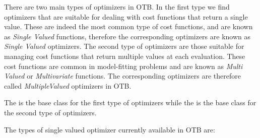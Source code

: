 There are two main types of optimizers in OTB. In the first type we find
optimizers that are suitable for dealing with cost functions that return a
single value. These are indeed the most common type of cost functions, and are
known as \emph{Single Valued} functions, therefore the corresponding optimizers
are known as \emph{Single Valued} optimizers. The second type of optimizers are
those suitable for managing cost functions that return multiple values at each
evaluation. These cost functions are common in model-fitting problems and are
known as \emph{Multi Valued} or \emph{Multivariate} functions.  The
corresponding optimizers are therefore called \emph{MultipleValued} optimizers
in OTB.

The  is the base class for the first
type of optimizers while the  is the
base class for the second type of optimizers.

The types of single valued optimizer currently available in OTB are:


